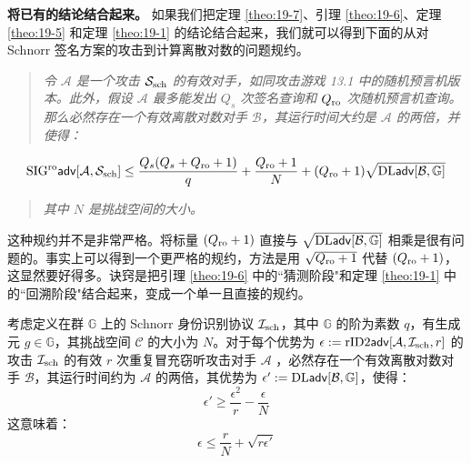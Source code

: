 \noindent
\textbf{将已有的结论结合起来。}
如果我们把定理 \ref{theo:19-7}、引理 \ref{theo:19-6}、定理 \ref{theo:19-5} 和定理 \ref{theo:19-1} 的结论结合起来，我们就可以得到下面的从对 Schnorr 签名方案的攻击到计算离散对数的问题规约。

\begin{quote}
\emph{令 $\mathcal{A}$ 是一个攻击 $\mathcal{S}_{\rm sch}$ 的有效对手，如同攻击游戏 13.1 中的随机预言机版本。此外，假设 $\mathcal{A}$ 最多能发出 $Q_s$ 次签名查询和 $Q_{\rm ro}$ 次随机预言机查询。那么必然存在一个有效离散对数对手 $\mathcal{B}$，其运行时间大约是 $\mathcal{A}$ 的两倍，并使得：}
\end{quote}
\begin{equation}\label{eq:19-6}
{\rm SIG^{ro}\mathsf{adv}}[\mathcal{A},\mathcal{S}_{\rm sch}]\leq\frac{Q_s(Q_s+Q_{\rm ro}+1)}{q}+\frac{Q_{\rm ro}+1}{N}+(Q_{\rm ro}+1)\sqrt{{\rm DL\mathsf{adv}}[\mathcal{B},\mathbb{G}]}
\end{equation}
\begin{quote}
\emph{其中 $N$ 是挑战空间的大小。}
\end{quote}

这种规约并不是非常严格。将标量 $(Q_{\rm ro}+1)$ 直接与 $\sqrt{{\rm DL\mathsf{adv}}[\mathcal{B},\mathbb{G}]}$ 相乘是很有问题的。事实上可以得到一个更严格的规约，方法是用 $\sqrt{Q_{\rm ro}+1}$ 代替 $(Q_{\rm ro}+1)$，这显然要好得多。诀窍是把引理 \ref{theo:19-6} 中的``猜测阶段"和定理 \ref{theo:19-1} 中的``回溯阶段"结合起来，变成一个单一且直接的规约。

\begin{lemma}\label{theo:19-8}
考虑定义在群 $\mathbb{G}$ 上的 Schnorr 身份识别协议 $\mathcal{I}_{\rm sch}$，其中 $\mathbb{G}$ 的阶为素数 $q$，有生成元 $g\in\mathbb{G}$，其挑战空间 $\mathcal{C}$ 的大小为 $N$。对于每个优势为 $\epsilon:={\rm rID2\mathsf{adv}}[\mathcal{A},\mathcal{I}_{\rm sch},r]$ 的攻击 $\mathcal{I}_{\rm sch}$ 的有效 $r$ 次重复冒充窃听攻击对手 $\mathcal{A}$ ，必然存在一个有效离散对数对手 $\mathcal{B}$，其运行时间约为 $\mathcal{A}$ 的两倍，其优势为 $\epsilon':={\rm DL\mathsf{adv}}[\mathcal{B},\mathbb{G}]$，使得：
\begin{equation}\label{eq:19-7}
\epsilon'\geq\frac{\epsilon^2}{r}-\frac{\epsilon}{N}
\end{equation}
这意味着：
\begin{equation}\label{eq:19-8}
\epsilon\leq\frac{r}{N}+\sqrt{r\epsilon'}
\end{equation}
\end{lemma}


